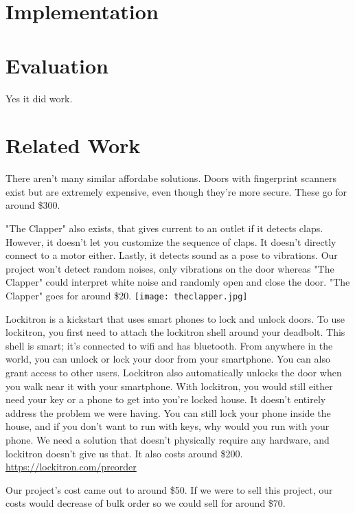 \documentclass[11pt]{article}			%
\begin{document}
\section{Implementation}

\section{Evaluation}
Yes it did work. 

\section{Related Work}
There aren't many similar affordabe solutions. Doors with fingerprint scanners exist but are extremely expensive, even though they're more secure. These go for around \$300.

"The Clapper" also exists, that gives current to an outlet if it detects claps. However, it doesn't let you customize the sequence of claps. It doesn't directly connect to a motor either. Lastly, it detects sound as a pose to vibrations. Our project won't detect random noises, only vibrations on the door whereas "The Clapper" could interpret white noise and randomly open and close the door. "The Clapper" goes for around \$20. 
\texttt{[image: theclapper.jpg]}

Lockitron is a kickstart that uses smart phones to lock and unlock doors. To use lockitron, you first need to attach the lockitron shell around your deadbolt. This shell is smart; it's connected to wifi and has bluetooth. From anywhere in the world, you can unlock or lock your door from your smartphone. You can also grant access to other users. Lockitron also automatically unlocks the door when you walk near it with your smartphone. With lockitron, you would still either need your key or a phone to get into you're locked house. It doesn't entirely address the problem we were having. You can still lock your phone inside the house, and if you don't want to run with keys, why would you run with your phone. We need a solution that doesn't physically require any hardware, and lockitron doesn't give us that. It also costs around \$200.
\url{https://lockitron.com/preorder}

Our project's cost came out to around \$50. If we were to sell this project, our costs would decrease of bulk order so we could sell for around \$70.
\end{document}
